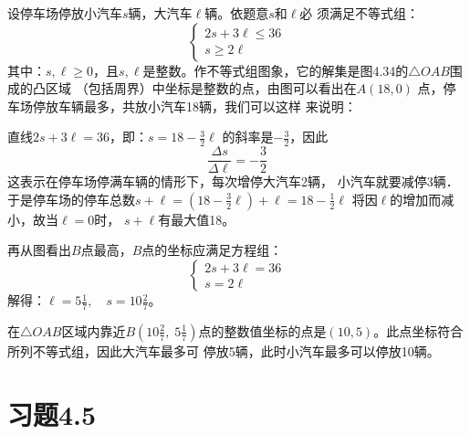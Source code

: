\begin{solution}
设停车场停放小汽车$s$辆，大汽车$\ell$辆。依题意$s$和$\ell$必
须满足不等式组： 
\[\begin{cases}
2s+3\ell\le 36\\
s\ge 2\ell    
\end{cases}\]
其中：$s,\ell\ge 0$，且$s,\ell$是整数。作不等式组图象，它的解集是图4.34的$\triangle OAB$围成的凸区域
（包括周界）中坐标是整数的点，由图可以看出在$A(18,0)$
点，停车场停放车辆最多，共放小汽车18辆，我们可以这样
来说明：

直线$2s+3\ell =36$，即：$s=18-\frac{3}{2}\ell$
的斜率是$-\frac{3}{2}$，因此
\[\frac{\Delta s}{\Delta \ell}=-\frac{3}{2}\]
这表示在停车场停满车辆的情形下，每次增停大汽车2辆，
小汽车就要减停3辆．于是停车场的停车总数$s+\ell=\left(18-\frac{3}{2}\ell\right)+\ell=18-\frac{1}{2}\ell$
将因$\ell$的增加而减小，故当$\ell=0$时，
$s+\ell$有最大值18。

\begin{figure}[htp]
    \centering
{}
    \caption{}
\end{figure}



再从图看出$B$点最高，$B$点的坐标应满足方程组：
\[\begin{cases}
    2s+3\ell=36\\
s=2\ell
\end{cases}\]
解得：$\ell=5\frac{1}{7},\quad s=10\frac{2}{7}$。

在$\triangle OAB$区域内靠近$B\left(10\frac{2}{7},\; 5\frac{1}{7}\right)$点的整数值坐标的点是$(10,5)$。此点坐标符合所列不等式组，因此大汽车最多可
停放5辆，此时小汽车最多可以停放10辆。
\end{solution}
   
\section*{习题4.5}

